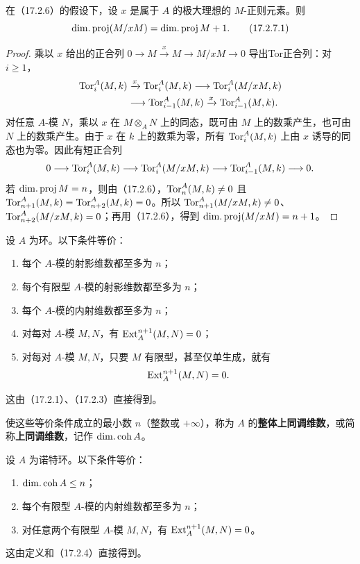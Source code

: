 在（17.2.6）的假设下，设 $x$ 是属于 $A$ 的极大理想的 $M$-正则元素。则
\begin{equation}
 \operatorname{dim.proj}(M/xM)=\operatorname{dim.proj} M+1.
 \tag{17.2.7.1}
\end{equation}
\begin{proof}
乘以 $x$ 给出的正合列 $0\to M\xrightarrow{x}M\to M/xM\to0$ 导出Tor正合列：对 $i\geq1$，
\[
 \begin{aligned}
 \operatorname{Tor}_i^A(M,k)&\xrightarrow{x}\operatorname{Tor}_i^A(M,k)
 \longrightarrow\operatorname{Tor}_i^A(M/xM,k)\\
 &\longrightarrow\operatorname{Tor}_{i-1}^A(M,k)
 \xrightarrow{x}\operatorname{Tor}_{i-1}^A(M,k).
 \end{aligned}
\]
对任意 $A$-模 $N$，乘以 $x$ 在 $M\otimes_A N$ 上的同态，既可由 $M$ 上的数乘产生，也可由 $N$ 上的数乘产生。由于 $x$ 在 $k$ 上的数乘为零，所有 $\operatorname{Tor}_i^A(M,k)$ 上由 $x$ 诱导的同态也为零。因此有短正合列
\[
 0\longrightarrow\operatorname{Tor}_i^A(M,k)\longrightarrow\operatorname{Tor}_i^A(M/xM,k)
 \longrightarrow\operatorname{Tor}_{i-1}^A(M,k)\longrightarrow0.
\]
若 $\operatorname{dim.proj} M=n$，则由（17.2.6），$\operatorname{Tor}_n^A(M,k)\ne0$ 且
$\operatorname{Tor}_{n+1}^A(M,k)=\operatorname{Tor}_{n+2}^A(M,k)=0$。所以
$\operatorname{Tor}_{n+1}^A(M/xM,k)\ne0$、$\operatorname{Tor}_{n+2}^A(M/xM,k)=0$；再用（17.2.6），得到 $\operatorname{dim.proj}(M/xM)=n+1$。
\end{proof}

设 $A$ 为环。以下条件等价：
\begin{enumerate}[label=\alph*)]
 \item 每个 $A$-模的射影维数都至多为 $n$；
 \item[$\mathrm a')$] 每个有限型 $A$-模的射影维数都至多为 $n$；
 \item[\(\mathrm b)\)] 每个 $A$-模的内射维数都至多为 $n$；
 \item[\(\mathrm c)\)] 对每对 $A$-模 $M,N$，有 $\operatorname{Ext}_A^{n+1}(M,N)=0$；
 \item[$\mathrm c')$] 对每对 $A$-模 $M,N$，只要 $M$ 有限型，甚至仅单生成，就有
 \[\operatorname{Ext}_A^{n+1}(M,N)=0.\]
\end{enumerate}
这由（17.2.1）、（17.2.3）直接得到。

使这些等价条件成立的最小数 $n$（整数或 $+\infty$），称为 $A$ 的\textbf{整体上同调维数}，或简称\textbf{上同调维数}，记作 $\operatorname{dim.coh} A$。

设 $A$ 为诺特环。以下条件等价：
\begin{enumerate}[label=\alph*)]
 \item $\operatorname{dim.coh} A\leq n$；
 \item 每个有限型 $A$-模的内射维数都至多为 $n$；
 \item 对任意两个有限型 $A$-模 $M,N$，有 $\operatorname{Ext}_A^{n+1}(M,N)=0$。
\end{enumerate}
这由定义和（17.2.4）直接得到。

